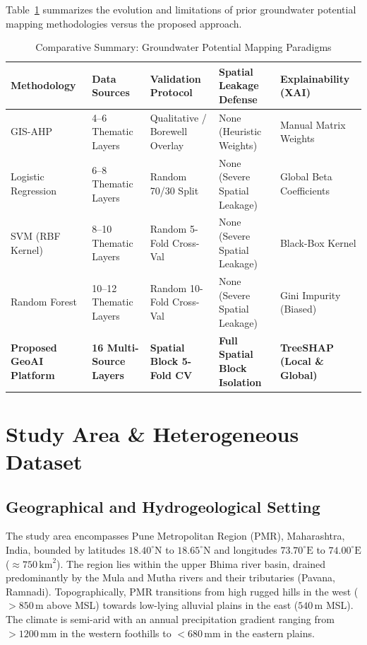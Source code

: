 \documentclass[conference]{IEEEtran}
\begin{document}
Table~\ref{tab:comparison} summarizes the evolution and limitations of prior groundwater potential mapping methodologies versus the proposed approach.

\begin{table}[t]
\centering
\caption{Comparative Summary: Groundwater Potential Mapping Paradigms}
\label{tab:comparison}
\begin{tabular}{lllll}
\toprule
\textbf{Methodology} & \textbf{Data Sources} & \textbf{Validation Protocol} & \textbf{Spatial Leakage Defense} & \textbf{Explainability (XAI)} \\
\midrule
GIS-AHP \cite{saaty1980, mallick2018} & 4--6 Thematic Layers & Qualitative / Borewell Overlay & None (Heuristic Weights) & Manual Matrix Weights \\
Logistic Regression \cite{pourghasemi2020} & 6--8 Thematic Layers & Random 70/30 Split & None (Severe Spatial Leakage) & Global Beta Coefficients \\
SVM (RBF Kernel) \cite{bui2019} & 8--10 Thematic Layers & Random 5-Fold Cross-Val & None (Severe Spatial Leakage) & Black-Box Kernel \\
Random Forest \cite{golkarian2018} & 10--12 Thematic Layers & Random 10-Fold Cross-Val & None (Severe Spatial Leakage) & Gini Impurity (Biased) \\
\textbf{Proposed GeoAI Platform} & \textbf{16 Multi-Source Layers} & \textbf{Spatial Block 5-Fold CV} & \textbf{Full Spatial Block Isolation} & \textbf{TreeSHAP (Local \& Global)} \\
\bottomrule
\end{tabular}
\end{table}

\section{Study Area \& Heterogeneous Dataset}
\subsection{Geographical and Hydrogeological Setting}
The study area encompasses Pune Metropolitan Region (PMR), Maharashtra, India, bounded by latitudes $18.40^\circ\text{N}$ to $18.65^\circ\text{N}$ and longitudes $73.70^\circ\text{E}$ to $74.00^\circ\text{E}$ ($\approx 750\,\text{km}^2$). The region lies within the upper Bhima river basin, drained predominantly by the Mula and Mutha rivers and their tributaries (Pavana, Ramnadi). Topographically, PMR transitions from high rugged hills in the west ($>850\,\text{m}$ above MSL) towards low-lying alluvial plains in the east ($540\,\text{m}$ MSL). The climate is semi-arid with an annual precipitation gradient ranging from $>1200\,\text{mm}$ in the western foothills to $<680\,\text{mm}$ in the eastern plains.
\end{document}
